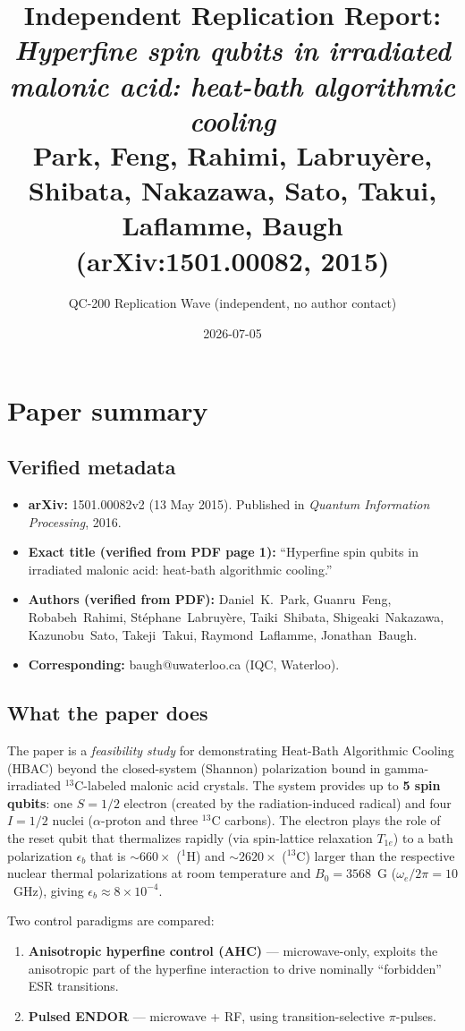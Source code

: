 \documentclass[11pt]{article}
\title{Independent Replication Report:\\
  \emph{Hyperfine spin qubits in irradiated malonic acid: heat-bath algorithmic cooling}\\
  \small Park, Feng, Rahimi, Labruy\`ere, Shibata, Nakazawa, Sato, Takui, Laflamme, Baugh (arXiv:1501.00082, 2015)}
\author{QC-200 Replication Wave (independent, no author contact)}
\date{2026-07-05}
\begin{document}
\maketitle

\section{Paper summary}

\subsection*{Verified metadata}
\begin{itemize}
  \item \textbf{arXiv:} 1501.00082v2 (13 May 2015). Published in \emph{Quantum Information Processing}, 2016.
  \item \textbf{Exact title (verified from PDF page 1):} ``Hyperfine spin qubits in irradiated malonic acid: heat-bath algorithmic cooling.''
  \item \textbf{Authors (verified from PDF):} Daniel~K.~Park, Guanru~Feng, Robabeh~Rahimi, St\'ephane~Labruy\`ere, Taiki~Shibata, Shigeaki~Nakazawa, Kazunobu~Sato, Takeji~Takui, Raymond~Laflamme, Jonathan~Baugh.
  \item \textbf{Corresponding:} baugh@uwaterloo.ca (IQC, Waterloo).
\end{itemize}

\subsection*{What the paper does}

The paper is a \emph{feasibility study} for demonstrating Heat-Bath Algorithmic
Cooling (HBAC) beyond the closed-system (Shannon) polarization bound in
gamma-irradiated $^{13}$C-labeled malonic acid crystals. The system provides up to
\textbf{5 spin qubits}: one $S=1/2$ electron (created by the radiation-induced
radical) and four $I=1/2$ nuclei ($\alpha$-proton and three $^{13}$C carbons).
The electron plays the role of the reset qubit that thermalizes rapidly (via
spin-lattice relaxation $T_{1e}$) to a bath polarization $\epsilon_b$ that is
$\sim 660\times$ ($^1$H) and $\sim 2620\times$ ($^{13}$C) larger than the
respective nuclear thermal polarizations at room temperature and $B_0 = 3568$~G
($\omega_e/2\pi = 10$~GHz), giving $\epsilon_b \approx 8\times 10^{-4}$.

Two control paradigms are compared:
\begin{enumerate}
  \item \textbf{Anisotropic hyperfine control (AHC)} --- microwave-only, exploits
    the anisotropic part of the hyperfine interaction to drive nominally
    ``forbidden'' ESR transitions.
  \item \textbf{Pulsed ENDOR} --- microwave + RF, using transition-selective
    $\pi$-pulses.
\end{enumerate}
\end{document}
